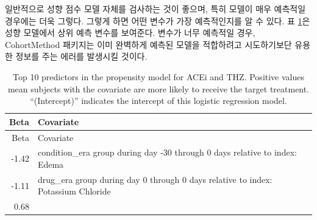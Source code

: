 \documentclass[11pt]{book}
\theoremstyle{definition}
\theoremstyle{definition}
\theoremstyle{definition}
\theoremstyle{remark}
\begin{document}
일반적으로 성향 점수 모델 자체를 검사하는 것이 좋으며, 특히 모델이 매우
예측적일 경우에는 더욱 그렇다. 그렇게 하면 어떤 변수가 가장 예측적인지를
알 수 있다. 표 \ref{tab:psModel}은 성향 모델에서 상위 예측 변수를
보여준다. 변수가 너무 예측적일 경우, CohortMethod 패키지는 이미 완벽하게
예측된 모델을 적합하려고 시도하기보단 유용한 정보를 주는 에러를 발생시킬
것이다. 

\begin{longtable}[]{@{}rl@{}}
\caption{\label{tab:psModel} Top 10 predictors in the propensity model for
ACEi and THZ. Positive values mean subjects with the covariate are more
likely to receive the target treatment. ``(Intercept)'' indicates the
intercept of this logistic regression model.}\tabularnewline
\toprule
\begin{minipage}[b]{0.07\columnwidth}\raggedleft\strut
Beta\strut
\end{minipage} & \begin{minipage}[b]{0.87\columnwidth}\raggedright\strut
Covariate\strut
\end{minipage}\tabularnewline
\midrule
\endfirsthead
\toprule
\begin{minipage}[b]{0.07\columnwidth}\raggedleft\strut
Beta\strut
\end{minipage} & \begin{minipage}[b]{0.87\columnwidth}\raggedright\strut
Covariate\strut
\end{minipage}\tabularnewline
\midrule
\endhead
\begin{minipage}[t]{0.07\columnwidth}\raggedleft\strut
-1.42\strut
\end{minipage} & \begin{minipage}[t]{0.87\columnwidth}\raggedright\strut
condition\_era group during day -30 through 0 days relative to index:
Edema\strut
\end{minipage}\tabularnewline
\begin{minipage}[t]{0.07\columnwidth}\raggedleft\strut
-1.11\strut
\end{minipage} & \begin{minipage}[t]{0.87\columnwidth}\raggedright\strut
drug\_era group during day 0 through 0 days relative to index: Potassium
Chloride\strut
\end{minipage}\tabularnewline
\begin{minipage}[t]{0.07\columnwidth}\raggedleft\strut
0.68\strut
\end{minipage} & \begin{minipage}[t]{0.87\columnwidth}\raggedright\strut

\end{minipage}
\end{longtable}
\end{document}
